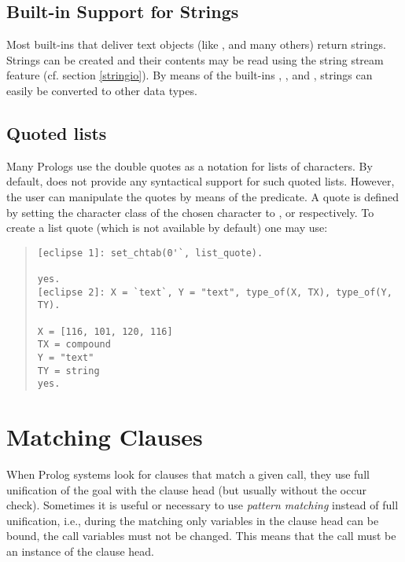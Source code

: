\subsection{Built-in Support for Strings}
Most {\eclipse} built-ins that deliver text objects (like
,
 and many
others) return strings.
Strings can be created and their contents may be read using the string
stream feature (cf. section \ref{stringio}).
By means of the built-ins
,
,
 and
,
strings can easily be converted to other data types.

\subsection{Quoted lists}

Many Prologs use the double quotes as a notation for
lists of characters. By default, {\eclipse} does not provide any
syntactical support for such quoted lists. However, the  user can
manipulate the quotes by means of the
predicate.
A quote is defined by setting the character class of the chosen character
to ,  or 
respectively.
To create a list quote (which is not available by default)
one may use:
\begin{quote}
\begin{verbatim}
[eclipse 1]: set_chtab(0'`, list_quote).

yes.
[eclipse 2]: X = `text`, Y = "text", type_of(X, TX), type_of(Y, TY).

X = [116, 101, 120, 116]
TX = compound
Y = "text"
TY = string
yes.
\end{verbatim}
\end{quote}


\section{Matching Clauses}
\label{matching}
When Prolog systems look for clauses that match a given call,
they use full unification of the goal with the clause head
(but usually without the occur check).
Sometimes it is useful or necessary to use {\it pattern matching}
instead of full unification, i.e., during the matching
only variables in the clause head can be bound, the call
variables must not be changed.
This means that the call must be an instance of the
clause head.

